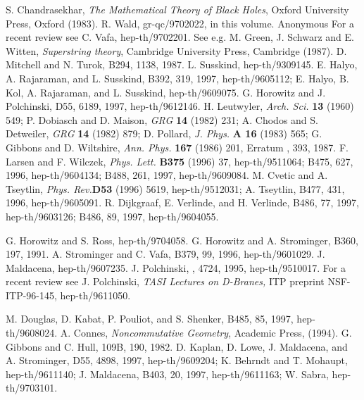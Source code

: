 \begin{thebibliography}{99}
\baselineskip=16pt

 S. Chandrasekhar, {\it The Mathematical Theory of Black Holes},
Oxford University Press, Oxford (1983).
 R. Wald, gr-qc/9702022, in this volume.
 Anonymous
 For a recent review  see C. Vafa, hep-th/9702201.
 See e.g. M. Green, J. Schwarz and E. Witten, {\it
Superstring theory}, Cambridge University Press, Cambridge (1987).
 D. Mitchell and N. Turok, \np B294, 1138, 1987.
L. Susskind, hep-th/9309145.
 E. Halyo,  A. Rajaraman, and L. Susskind, \pl B392, 319, 1997,
hep-th/9605112;
E. Halyo, B. Kol, A. Rajaraman, and L. Susskind,  hep-th/9609075.
 G. Horowitz and J. Polchinski, \pr D55, 6189, 1997,
hep-th/9612146.
 H. Leutwyler, {\sl Arch. Sci.} {\bf 13} (1960) 549;
P. Dobiasch and D. Maison, {\sl GRG} {\bf 14} (1982) 231;
A. Chodos and S. Detweiler, {\sl GRG} {\bf 14} (1982) 879;
D. Pollard, {\sl J.  Phys.} {\bf A 16} (1983) 565;
G. Gibbons and D. Wiltshire, {\sl Ann. Phys.} {\bf 167} (1986) 201, Erratum
, 393, 1987.
F. Larsen and F. Wilczek, {\sl Phys. Lett.} {\bf B375} (1996) 37,
hep-th/9511064; \np B475, 627, 1996,
hep-th/9604134; \np B488, 261, 1997, hep-th/9609084.
 M. Cvetic and A. Tseytlin, {\sl Phys. Rev.}{\bf D53} (1996) 5619,
hep-th/9512031; A. Tseytlin, \np   B477, 431, 1996, hep-th/9605091.
 R. Dijkgraaf, E. Verlinde, and H. Verlinde, \np B486, 77, 1997,
hep-th/9603126; \np B486, 89, 1997, hep-th/9604055.

 G. Horowitz and S. Ross, hep-th/9704058.
 G. Horowitz and A. Strominger, \np B360, 197, 1991.
 A. Strominger and C. Vafa, \pl  B379, 99, 1996,
hep-th/9601029.
 J. Maldacena, hep-th/9607235.
 J. Polchinski, , 4724, 1995,
hep-th/9510017. For a recent
 review see J. Polchinski, {\it TASI Lectures on
 D-Branes,} ITP preprint NSF-ITP-96-145, hep-th/9611050.

 M. Douglas, D. Kabat, P. Pouliot, and S. Shenker, 
\np B485, 85, 1997, hep-th/9608024.
 A. Connes, {\it Noncommutative Geometry}, Academic Press,
(1994).
 G. Gibbons and C. Hull, \pl 109B, 190, 1982.
 D. Kaplan, D. Lowe, J. Maldacena, and A. Strominger,
\pr D55, 4898, 1997, hep-th/9609204; K. Behrndt and T. Mohaupt,
hep-th/9611140; J. Maldacena, \pl B403, 20, 1997, hep-th/9611163;
W. Sabra, hep-th/9703101.


\end{thebibliography}
